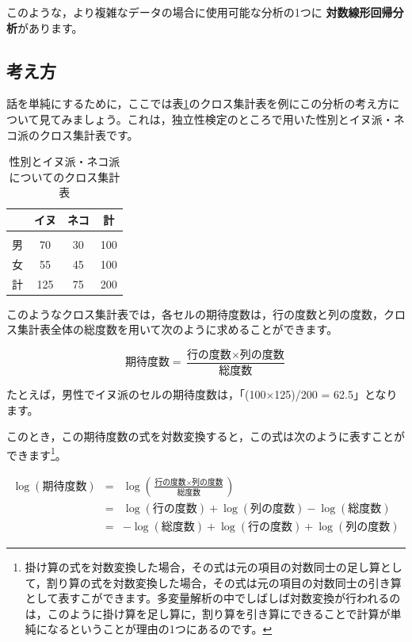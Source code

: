 \documentclass[
  12pt,
  a5jpaper,
  lualatex, ja=standard]{bxjsbook}
\renewcommand{\emph}[1]{\textbf{\color{emph} #1}}
\begin{document}
このような，より複雑なデータの場合に使用可能な分析の1つに\emph{対数線形回帰分析}があります。

\hypertarget{sub:frequencies-loglin-basics}{%
\subsection{考え方}\label{sub:frequencies-loglin-basics}}

話を単純にするために，ここでは表\ref{tab:frequencies-loglin-table1}のクロス集計表を例にこの分析の考え方について見てみましょう。これは，独立性検定のところで用いた性別とイヌ派・ネコ派のクロス集計表です。

\begin{table}[H]

\caption{\label{tab:frequencies-loglin-table1}性別とイヌ派・ネコ派についてのクロス集計表}
\centering
\begin{tabular}[t]{lccc}
\toprule
  & イヌ & ネコ & 計\\
\midrule
\addlinespace[0.3em]
\multicolumn{4}{l}{\textbf{性別}}\\
\hspace{1em}男 & 70 & 30 & 100\\
\hspace{1em}女 & 55 & 45 & 100\\
計 & 125 & 75 & 200\\
\bottomrule
\end{tabular}
\end{table}

このようなクロス集計表では，各セルの期待度数は，行の度数と列の度数，クロス集計表全体の総度数を用いて次のように求めることができます。

\[
 \text{期待度数} = \frac{\text{行の度数}\times\text{列の度数}}{\text{総度数}}
\]

たとえば，男性でイヌ派のセルの期待度数は，「(100×125)/200 = 62.5」となります。

このとき，この期待度数の式を対数変換すると，この式は次のように表すことができます\footnote{掛け算の式を対数変換した場合，その式は元の項目の対数同士の足し算として，割り算の式を対数変換した場合，その式は元の項目の対数同士の引き算として表すこができます。多変量解析の中でしばしば対数変換が行われるのは，このように掛け算を足し算に，割り算を引き算にできることで計算が単純になるということが理由の1つにあるのです。}。

\begin{eqnarray*}
 \log(\text{期待度数}) %
 & =& \log\left(\frac{\text{行の度数}\times\text{列の度数}}{\text{総度数}}\right)\\
 &=&  \log(\text{行の度数})+\log(\text{列の度数}) - \log(\text{総度数}) \\
 &=&  - \log(\text{総度数}) + \log(\text{行の度数})+\log(\text{列の度数})
\end{eqnarray*}
\end{document}
